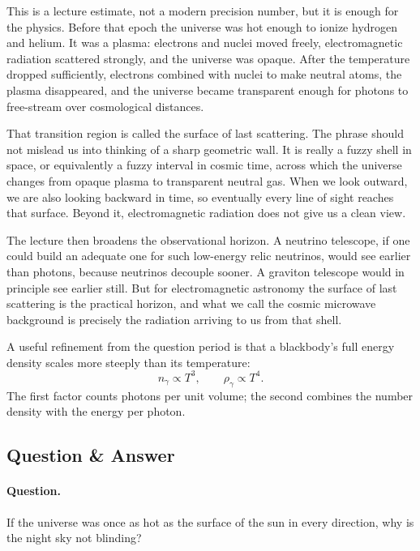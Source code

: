 This is a lecture estimate, not a modern precision number, but it is enough for the physics. Before that epoch the universe was hot enough to ionize hydrogen and helium. It was a plasma: electrons and nuclei moved freely, electromagnetic radiation scattered strongly, and the universe was opaque. After the temperature dropped sufficiently, electrons combined with nuclei to make neutral atoms, the plasma disappeared, and the universe became transparent enough for photons to free-stream over cosmological distances.

That transition region is called the surface of last scattering. The phrase should not mislead us into thinking of a sharp geometric wall. It is really a fuzzy shell in space, or equivalently a fuzzy interval in cosmic time, across which the universe changes from opaque plasma to transparent neutral gas. When we look outward, we are also looking backward in time, so eventually every line of sight reaches that surface. Beyond it, electromagnetic radiation does not give us a clean view.

The lecture then broadens the observational horizon. A neutrino telescope, if one could build an adequate one for such low-energy relic neutrinos, would see earlier than photons, because neutrinos decouple sooner. A graviton telescope would in principle see earlier still. But for electromagnetic astronomy the surface of last scattering is the practical horizon, and what we call the cosmic microwave background is precisely the radiation arriving to us from that shell.

A useful refinement from the question period is that a blackbody's full energy density scales more steeply than its temperature:
\begin{equation}
n_\gamma\propto T^3,
\qquad
\rho_\gamma\propto T^4.
\end{equation}
The first factor counts photons per unit volume; the second combines the number density with the energy per photon.

\subsection{Question \& Answer}

\paragraph{Question.} If the universe was once as hot as the surface of the sun in every direction, why is the night sky not blinding?


